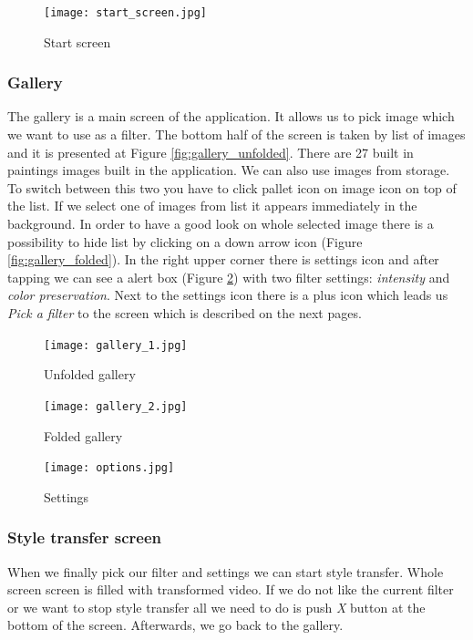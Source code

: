 \documentclass[../Main.tex]{subfiles}
\begin{document}
\begin{figure}[H]
    \centering
    \texttt{[image: start\_screen.jpg]}
    \caption{Start screen}
    \label{fig:start-screen}
\end{figure}


\subsubsection{Gallery}
The gallery is a main screen of the application. It allows us to pick image 
which we want to use as a filter. The bottom half of the screen is taken by list of images and it is presented at Figure \ref{fig:gallery_unfolded}.
There are 27 built in paintings images built in the application. We can also use images from storage.
To switch between this two you have to click pallet icon on image icon on top of the list.
If we select one of images from list it appears immediately in the background.
In order to have a good look on whole selected image there is a possibility 
to hide list by clicking on a down arrow icon (Figure \ref{fig:gallery_folded}).
In the right upper corner there is settings icon and after tapping we can see a 
alert box (Figure \ref{fig:gallery_options}) with two filter settings:
\textit{intensity} and \textit{color preservation}.
Next to the settings icon there is a plus icon which leads us \textit{Pick a filter} 
to the screen which is described on the next pages.

\begin{figure}[H]
        \texttt{[image: gallery\_1.jpg]}
        \caption{Unfolded gallery}\label{fig:gallery_unfolded}
    \endminipage\hfill
        \texttt{[image: gallery\_2.jpg]}
        \caption{Folded gallery}\label{fig:gallery_folded}
    \endminipage\hfill
        \texttt{[image: options.jpg]}
        \caption{Settings}\label{fig:gallery_options}
    \endminipage\hfill
\end{figure}


\subsubsection{Style transfer screen}
When we finally pick our filter and settings we can start style transfer.
Whole screen screen is filled with transformed video.
If we do not like the current filter or we want to stop style transfer all we need to 
do is push \textit{X} button at the bottom of the screen.
Afterwards, we go back to the gallery. 
\end{document}
